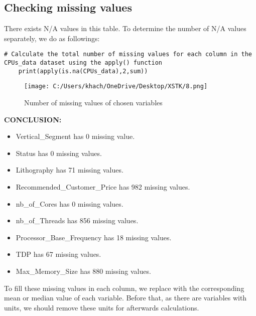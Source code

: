 \documentclass[a4paper]{article}
\begin{document}
	\subsection{Checking missing values}
	There exists N/A values in this table. To determine the number of N/A values separately, we do as followings:\\
	\begin{lstlisting}[frame=single, backgroundcolor=\color{gray!10}, breaklines=true, columns=fullflexible]
	# Calculate the total number of missing values for each column in the CPUs_data dataset using the apply() function
	print(apply(is.na(CPUs_data),2,sum))
	\end{lstlisting}
	\begin{figure}[htbp]
		\centering
		\begin{adjustbox}{width=0.7\textwidth, frame}
			\texttt{[image: C:/Users/khach/OneDrive/Desktop/XSTK/8.png]}
		\end{adjustbox}
		\captionsetup{justification=centering}
		\vspace{0.5cm}
		\caption{Number of missing values of chosen variables}
	\end{figure}
	\textbf{CONCLUSION:}
	\begin{itemize}
		\item Vertical\_Segment has 0 missing value.
		\item Status has 0 missing values.
		\item Lithography has 71 missing values.
		\item Recommended\_Customer\_Price has 982 missing values.
		\item nb\_of\_Cores has 0 missing values.
		\item nb\_of\_Threads has 856 missing values.
		\item Processor\_Base\_Frequency has 18 missing values.
		\item TDP has 67 missing values.
		\item Max\_Memory\_Size has 880 missing values.
	\end{itemize} 
	To fill these missing values in each column, we replace with the corresponding mean or median value of each variable. Before that, as there are variables with units, we should remove these units for afterwards calculations.
\end{document}
